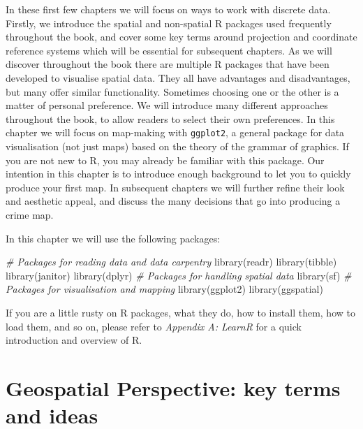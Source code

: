 \documentclass[
  krantz2]{krantz}
\makeatletter
\newenvironment{Shaded}{\begin{snugshade}}{\end{snugshade}}
\newcommand{\CommentTok}[1]{\textcolor[rgb]{0.37,0.37,0.37}{\textit{#1}}}
\newcommand{\FunctionTok}[1]{\textcolor[rgb]{0,0,0}{#1}}
\newcommand{\NormalTok}[1]{#1}
\newenvironment{kframe}{%
\medskip{}
\setlength{\fboxsep}{.8em}
 \def\at@end@of@kframe{}%
 \ifinner\ifhmode%
  \def\at@end@of@kframe{\end{minipage}}%
  \begin{minipage}{\columnwidth}%
 \fi\fi%
 \def\FrameCommand##1{\hskip\@totalleftmargin \hskip-\fboxsep
 \colorbox{shadecolor}{##1}\hskip-\fboxsep
     \hskip-\linewidth \hskip-\@totalleftmargin \hskip\columnwidth}%
 \MakeFramed {\advance\hsize-\width
   \@totalleftmargin\z@ \linewidth\hsize
   \@setminipage}}%
 {\par\unskip\endMakeFramed%
 \at@end@of@kframe}
\renewenvironment{Shaded}{\begin{kframe}}{\end{kframe}}
\makeatother
\begin{document}
In these first few chapters we will focus on ways to work with discrete data. Firstly, we introduce the spatial and non-spatial R packages used frequently throughout the book, and cover some key terms around projection and coordinate reference systems which will be essential for subsequent chapters. As we will discover throughout the book there are multiple R packages that have been developed to visualise spatial data. They all have advantages and disadvantages, but many offer similar functionality. Sometimes choosing one or the other is a matter of personal preference. We will introduce many different approaches throughout the book, to allow readers to select their own preferences. In this chapter we will focus on map-making with \texttt{ggplot2}, a general package for data visualisation (not just maps) based on the theory of the grammar of graphics. If you are not new to R, you may already be familiar with this package. Our intention in this chapter is to introduce enough background to let you to quickly produce your first map. In subsequent chapters we will further refine their look and aesthetic appeal, and discuss the many decisions that go into producing a crime map.

In this chapter we will use the following packages:

\begin{Shaded}
\begin{Highlighting}[]
\CommentTok{\# Packages for reading data and data carpentry}
\FunctionTok{library}\NormalTok{(readr)}
\FunctionTok{library}\NormalTok{(tibble)}
\FunctionTok{library}\NormalTok{(janitor)}
\FunctionTok{library}\NormalTok{(dplyr)}
\CommentTok{\# Packages for handling spatial data}
\FunctionTok{library}\NormalTok{(sf)}
\CommentTok{\# Packages for visualisation and mapping}
\FunctionTok{library}\NormalTok{(ggplot2)}
\FunctionTok{library}\NormalTok{(ggspatial)}
\end{Highlighting}
\end{Shaded}

If you are a little rusty on R packages, what they do, how to install them, how to load them, and so on, please refer to \emph{Appendix A: LearnR} for a quick introduction and overview of R.

\hypertarget{geospatial-perspective-key-terms-and-ideas}{%
\section{Geospatial Perspective: key terms and ideas}\label{geospatial-perspective-key-terms-and-ideas}}
\end{document}
